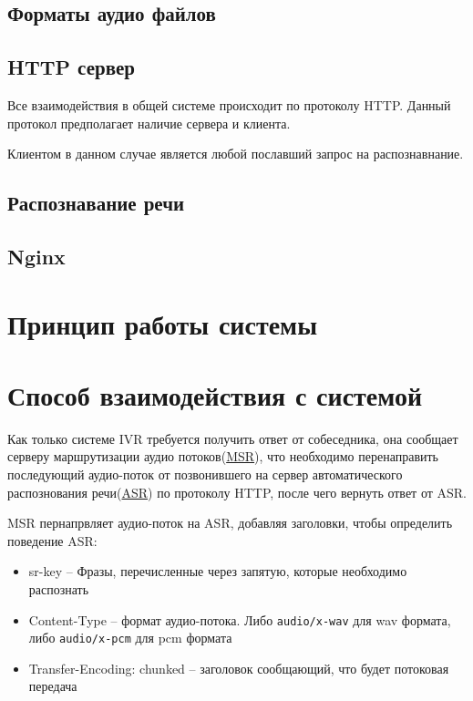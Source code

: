 \subsection{Форматы аудио файлов}

\subsection{HTTP сервер}
Все взаимодействия в общей системе происходит по протоколу HTTP. Данный протокол
предполагает наличие сервера и клиента.

Клиентом в данном случае является любой пославший запрос на распознавнание.

\subsection{Распознавание речи}
\subsection{Nginx}
\section{Принцип работы системы}
\section{Способ взаимодействия с системой}
Как только системе IVR требуется получить ответ от собеседника, она
сообщает серверу маршрутизации аудио потоков(\hyperlink{msr}{MSR}), что необходимо
перенаправить последующий аудио-поток от позвонившего на сервер автоматического
распознования речи(\hyperlink{asr}{ASR}) по протоколу HTTP, после чего вернуть
ответ от ASR.

MSR пернапрвляет аудио-поток на ASR, добавляя заголовки, чтобы определить поведение
ASR:
\begin{itemize}
    \item sr-key -- Фразы, перечисленные через запятую, которые необходимо распознать
    \item Content-Type -- формат аудио-потока. Либо {\tt audio/x-wav} для wav формата,
    либо {\tt audio/x-pcm} для pcm формата
    \item Transfer-Encoding: chunked -- заголовок сообщающий, что будет потоковая передача
\end{itemize}
